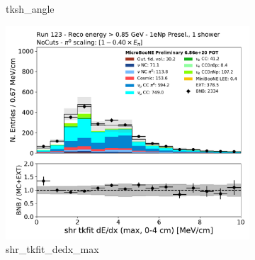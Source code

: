 \begin{figure}[H]
\begin{subfigure}{0.3\textwidth}
    \caption{tksh\_angle}
    \end{subfigure}
    \begin{subfigure}{0.3\textwidth}
    \includegraphics[width=1.0\textwidth]{Sidebands/Figures/1eNp/HighEnergy/HiEext_NPOneShr_None_pi0e040/shr_tkfit_dedx_max.pdf}
    \caption{shr\_tkfit\_dedx\_max}
    \end{subfigure}
    \caption{} 
    \label{fig:HE_1eNp_1}
\end{figure}

